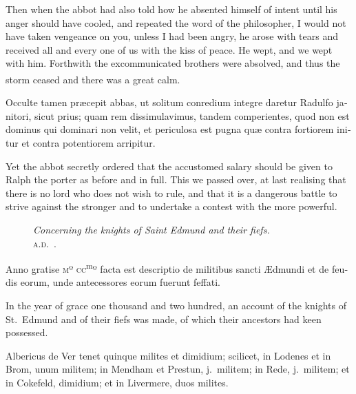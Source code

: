\documentclass{book}
\newcounter{engnote}
\newcommand{\engnotenum}{\textsuperscript{\arabic{engnote}\stepcounter{engnote}}}
\newcommand{\blockhead}[4][]{
\begin{figure}
\centering
\vspace{#4}
\parbox{2.75cm}{\begin{center}\footnotesize \color{BrickRed} \emph{#2}\\ #1 \end{center}}
\end{figure}
}
\begin{document}
\begin{paracol}{2}
\switchcolumn

Then when the abbot had also told how he absented himself of intent until his anger should have cooled, and repeated the word of the philosopher, I would not have taken vengeance on you, unless I had been angry, he arose with tears and received all and every one of us with the kiss of peace. He wept, and we wept with him. Forthwith the excommunicated brothers were absolved, and thus the storm ceased and there was a great calm.\engnotenum{}

\switchcolumn*

\begin{otherlanguage}{latin}
Occulte tamen pr\ae{}cepit abbas, ut solitum conredium integre daretur Radulfo janitori, sicut prius; quam rem dissimulavimus, tandem comperientes, quod non est dominus qui dominari non velit, et periculosa est pugna qu\ae{} contra fortiorem initur et contra potentiorem arripitur.
\end{otherlanguage}

\switchcolumn

Yet the abbot secretly ordered that the accustomed salary should be given to Ralph the porter as before and in full. This we passed over, at last realising that there is no lord who does not wish to rule, and that it is a dangerous battle to strive against the stronger and to undertake a contest with the more powerful.

\switchcolumn*

\begin{otherlanguage}{latin}
\blockhead[\textsc{a.d}.\ .]{Concerning the knights of Saint Edmund and their fiefs.}{4}{-.65cm}
Anno gratise \textsc{m}º \textsc{cc}\textsuperscript{m}º facta est descriptio de militibus sancti \AE{}dmundi et de feudis eorum, unde antecessores eorum fuerunt feffati.

\end{otherlanguage}

\switchcolumn

In the year of grace one thousand and two hundred, an account of the knights of St.\ Edmund and of their fiefs was made, of which their ancestors had keen possessed.

\switchcolumn*

\begin{otherlanguage}{latin}
Albericus de Ver tenet quinque milites et dimidium; scilicet, in Lodenes et in Brom, unum militem; in Mendham et Prestun, j.\ militem; in Rede, j.\ militem; et in Cokefeld, dimidium; et in Livermere, duos milites.
\end{otherlanguage}


\end{paracol}
\end{document}
